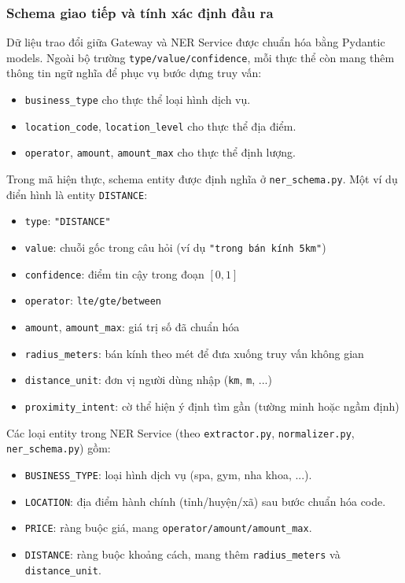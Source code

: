 \subsubsection{Schema giao tiếp và tính xác định đầu ra}

Dữ liệu trao đổi giữa Gateway và NER Service được chuẩn hóa bằng Pydantic models. Ngoài bộ trường \texttt{type/value/confidence}, mỗi thực thể còn mang thêm thông tin ngữ nghĩa để phục vụ bước dựng truy vấn:
\begin{itemize}
    \item \texttt{business\_type} cho thực thể loại hình dịch vụ.
    \item \texttt{location\_code}, \texttt{location\_level} cho thực thể địa điểm.
    \item \texttt{operator}, \texttt{amount}, \texttt{amount\_max} cho thực thể định lượng.
\end{itemize}

Trong mã hiện thực, schema entity được định nghĩa ở \texttt{ner\_schema.py}. Một ví dụ điển hình là entity \texttt{DISTANCE}:
\begin{itemize}
    \item \texttt{type}: \texttt{"DISTANCE"}
    \item \texttt{value}: chuỗi gốc trong câu hỏi (ví dụ \texttt{"trong bán kính 5km"})
    \item \texttt{confidence}: điểm tin cậy trong đoạn $[0,1]$
    \item \texttt{operator}: \texttt{lte/gte/between}
    \item \texttt{amount}, \texttt{amount\_max}: giá trị số đã chuẩn hóa
    \item \texttt{radius\_meters}: bán kính theo mét để đưa xuống truy vấn không gian
    \item \texttt{distance\_unit}: đơn vị người dùng nhập (\texttt{km}, \texttt{m}, ...)
    \item \texttt{proximity\_intent}: cờ thể hiện ý định tìm gần (tường minh hoặc ngầm định)
\end{itemize}

Các loại entity trong NER Service (theo \texttt{extractor.py}, \texttt{normalizer.py}, \texttt{ner\_schema.py}) gồm:
\begin{itemize}
    \item \texttt{BUSINESS\_TYPE}: loại hình dịch vụ (spa, gym, nha khoa, ...).
    \item \texttt{LOCATION}: địa điểm hành chính (tỉnh/huyện/xã) sau bước chuẩn hóa code.
    \item \texttt{PRICE}: ràng buộc giá, mang \texttt{operator/amount/amount\_max}.
    \item \texttt{DISTANCE}: ràng buộc khoảng cách, mang thêm \texttt{radius\_meters} và \texttt{distance\_unit}.
\end{itemize}

